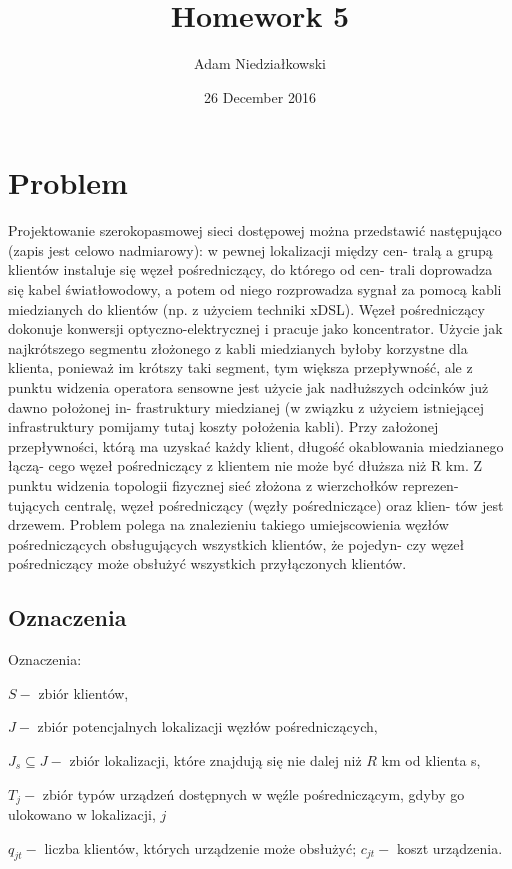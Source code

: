 \documentclass{article}
\title{Homework 5}
\author{Adam Niedziałkowski}
\date{26 December 2016}
\begin{document}
\maketitle

\section{Problem}
Projektowanie szerokopasmowej sieci dostępowej można przedstawić następująco
(zapis jest celowo nadmiarowy): w pewnej lokalizacji między cen-
tralą a grupą klientów instaluje się węzeł pośredniczący, do którego od cen-
trali doprowadza się kabel światłowodowy, a potem od niego rozprowadza
sygnał za pomocą kabli miedzianych do klientów (np. z użyciem techniki
xDSL).  Węzeł  pośredniczący  dokonuje  konwersji  optyczno-elektrycznej  i
pracuje  jako  koncentrator.  Użycie  jak  najkrótszego  segmentu  złożonego
z  kabli  miedzianych  byłoby  korzystne  dla  klienta,  ponieważ  im  krótszy
taki segment, tym większa przepływność, ale z punktu widzenia operatora
sensowne jest użycie jak nadłuższych odcinków już dawno położonej in-
frastruktury  miedzianej  (w  związku  z  użyciem  istniejącej  infrastruktury
pomijamy  tutaj  koszty  położenia  kabli).  Przy  założonej  przepływności,
którą ma uzyskać każdy klient, długość okablowania miedzianego łączą-
cego  węzeł  pośredniczący  z  klientem  nie  może  być  dłuższa  niż R km.
Z punktu widzenia topologii fizycznej sieć złożona z wierzchołków reprezen-
tujących centralę, węzeł pośredniczący (węzły pośredniczące) oraz klien-
tów jest drzewem. Problem polega na znalezieniu takiego umiejscowienia
węzłów pośredniczących obsługujących wszystkich klientów, że pojedyn-
czy  węzeł  pośredniczący  może  obsłużyć  wszystkich  przyłączonych  klientów.

\subsection{Oznaczenia}
Oznaczenia:

$S - $ zbiór klientów,

$J - $ zbiór potencjalnych lokalizacji węzłów pośredniczących,

$J_s\subseteq J - $ zbiór lokalizacji, które znajdują się nie dalej niż $R$ km od klienta s,

$T_j - $ zbiór typów urządzeń dostępnych w węźle pośredniczącym, gdyby go ulokowano w lokalizacji, $j$

$q_{jt} - $ liczba klientów, których urządzenie może obsłużyć;
$c_{jt} - $ koszt urządzenia.
\end{document}
